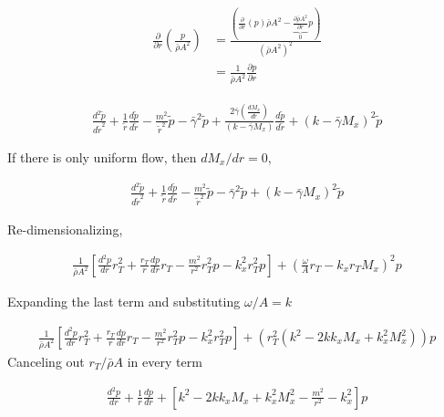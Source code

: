 \begin{align*}
    \frac{\partial}{\partial r} \left( \frac{p}{\bar{\rho} A^2} \right) 
    &=
    \frac{\left(\frac{\partial}{\partial r} \left(  p\right) \bar{\rho} A^2 - 
    \underbrace{\frac{\partial \bar{\rho}A^2}{\partial r}}_0 p \right)}{\left( \bar{\rho} A^2 \right)^2}\\ 
    &= \frac{1}{\bar{\rho}A^2} \frac{\partial p}{\partial r}
\end{align*}

\begin{align*}
    \frac{ d^2 \tilde{p}}{d \tilde{r}^2} +
    \frac{1}{\tilde{r}} 
    \frac{d \tilde{p}}{d \tilde{r}}- 
    \frac{m^2}{\tilde{r}^2}\tilde{p}- 
    \bar{\gamma}^2  \tilde{p}
 + 
    \frac{2 \bar{\gamma} \left( \frac{d M_x}{d \tilde{r}} \right)}
    {\left( k - \bar{\gamma} M_x \right)}\frac{d \tilde{p}}{d \tilde{r}}+
    \left( k - \bar{\gamma} M_x \right)^2\tilde{p} 
\end{align*}

If there is only uniform flow, then $dM_x/dr = 0$,

\begin{align*}
    \frac{ d^2 \tilde{p}}{d \tilde{r}^2} +
    \frac{1}{\tilde{r}} 
    \frac{d \tilde{p}}{d \tilde{r}}- 
    \frac{m^2}{\tilde{r}^2}\tilde{p}- 
    \bar{\gamma}^2  \tilde{p}
 + 
    \left( k - \bar{\gamma} M_x \right)^2\tilde{p} 
\end{align*}

Re-dimensionalizing,

\begin{align*}
    \frac{1}{\bar{\rho} A^2}\left[
    \frac{ d^2 p}{d r} r_T^2+
    \frac{r_T}{r} 
    \frac{d p}{d r} r_T - 
    \frac{m^2}{r^2}r_T^2 p - k_x^2r_T^2  p\right]
    + \left( \frac{\omega }{A}r_T - k_x r_T M_x \right)^2p 
\end{align*}

Expanding the last term and substituting $\omega/A = k$

\begin{align*}
    \frac{1}{\bar{\rho} A^2}\left[
    \frac{ d^2 p}{d r} r_T^2+
    \frac{r_T}{r} 
    \frac{d p}{d r} r_T - 
    \frac{m^2}{r^2}r_T^2 p - k_x^2r_T^2  p\right]
    +\left( r_T^2\left(
        k^2 - 2 k k_x M_x + k_x^2 M_x^2 \right)
    \right)p 
\end{align*}
Canceling out $r_T/\bar{\rho}A$ in every term


\begin{align*}
    \frac{ d^2 p}{d r} +
    \frac{1}{r} 
    \frac{d p}{d r} + \left[ 
    k^2 - 2 k k_x M_x + k_x^2 M_x^2- \frac{m^2}{r^2}  - k_x^2\right]p 
\end{align*}

